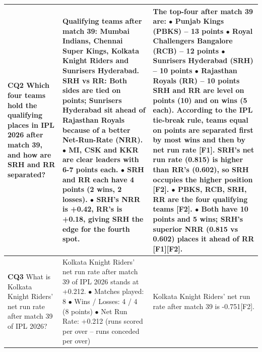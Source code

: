 \begin{longtable}{p{1.9cm}p{6.8cm}p{6.8cm}}
\textbf{CQ2} \newline \scriptsize Which four teams hold the qualifying places in IPL 2026 after match 39, and how are SRH and RR separated? & \scriptsize Qualifying teams after match 39: Mumbai Indians, Chennai Super Kings, Kolkata Knight Riders and Sunrisers Hyderabad. \newline SRH vs RR: Both sides are tied on points; Sunrisers Hyderabad sit ahead of Rajasthan Royals because of a better Net-Run-Rate (NRR). \newline \quad$\bullet$ MI, CSK and KKR are clear leaders with 6-7 points each. \newline \quad$\bullet$ SRH and RR each have 4 points (2 wins, 2 losses). \newline \quad$\bullet$ SRH's NRR is +0.42, RR's is +0.18, giving SRH the edge for the fourth spot. & \scriptsize The top-four after match 39 are: \newline \quad$\bullet$ Punjab Kings (PBKS) -- 13 points \newline \quad$\bullet$ Royal Challengers Bangalore (RCB) -- 12 points \newline \quad$\bullet$ Sunrisers Hyderabad (SRH) -- 10 points \newline \quad$\bullet$ Rajasthan Royals (RR) -- 10 points \newline SRH and RR are level on points (10) and on wins (5 each). According to the IPL tie-break rule, teams equal on points are separated first by most wins and then by net run rate \textsf{[F1]}. SRH's net run rate (0.815) is higher than RR's (0.602), so SRH occupies the higher position \textsf{[F2]}. \newline \quad$\bullet$ PBKS, RCB, SRH, RR are the four qualifying teams \textsf{[F2]}. \newline \quad$\bullet$ Both have 10 points and 5 wins; SRH's superior NRR (0.815 vs 0.602) places it ahead of RR \textsf{[F1]}\textsf{[F2]}. \\ \midrule
\textbf{CQ3} \newline \scriptsize What is Kolkata Knight Riders' net run rate after match 39 of IPL 2026? & \scriptsize Kolkata Knight Riders' net run rate after match 39 of IPL 2026 stands at +0.212. \newline \quad$\bullet$ Matches played: 8 \newline \quad$\bullet$ Wins / Losses: 4 / 4 (8 points) \newline \quad$\bullet$ Net Run Rate: +0.212 (runs scored per over -- runs conceded per over) & \scriptsize Kolkata Knight Riders' net run rate after match 39 is -0.751\textsf{[F2]}. \\ \midrule

\end{longtable}
